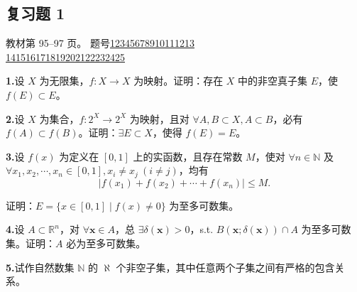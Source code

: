 \documentclass[11pt,a4paper]{article}
\begin{document}
\subsection*{复习题 1}
\noindent 教材第 95--97 页。
\noindent 题号\quad \hyperlink{review-q1}{1}\enspace \hyperlink{review-q2}{2}\enspace \hyperlink{review-q3}{3}\enspace \hyperlink{review-q4}{4}\enspace \hyperlink{review-q5}{5}\enspace \hyperlink{review-q6}{6}\enspace \hyperlink{review-q7}{7}\enspace \hyperlink{review-q8}{8}\enspace \hyperlink{review-q9}{9}\enspace \hyperlink{review-q10}{10}\enspace \hyperlink{review-q11}{11}\enspace \hyperlink{review-q12}{12}\enspace \hyperlink{review-q13}{13}\enspace \\\hspace*{3em} \hyperlink{review-q14}{14}\enspace \hyperlink{review-q15}{15}\enspace \hyperlink{review-q16}{16}\enspace \hyperlink{review-q17}{17}\enspace \hyperlink{review-q18}{18}\enspace \hyperlink{review-q19}{19}\enspace \hyperlink{review-q20}{20}\enspace \hyperlink{review-q21}{21}\enspace \hyperlink{review-q22}{22}\enspace \hyperlink{review-q23}{23}\enspace \hyperlink{review-q24}{24}\enspace \hyperlink{review-q25}{25}\enspace
\par{}\noindent\hypertarget{review-q1}{}\textbf{1.}\quad 设 $X$ 为无限集，$f:X\to X$ 为映射。证明：存在 $X$ 中的非空真子集 $E$，使 $f(E)\subset E$。
\par{}\noindent\hypertarget{review-q2}{}\textbf{2.}\quad 设 $X$ 为集合，$f:2^X\to 2^X$ 为映射，且对 $\forall A,B\subset X,A\subset B$，必有 $f(A)\subset f(B)$。证明：$\exists E\subset X$，使得 $f(E)=E$。
\par{}\noindent\hypertarget{review-q3}{}\textbf{3.}\quad 设 $f(x)$ 为定义在 $[0,1]$ 上的实函数，且存在常数 $M$，使对 $\forall n\in\mathbb N$ 及 $\forall x_1,x_2,\cdots,x_n\in[0,1],x_i\ne x_j\ (i\ne j)$，均有
\[|f(x_1)+f(x_2)+\cdots+f(x_n)|\leq M.\]
\par\noindent 证明：$E=\{x\in[0,1]\mid f(x)\ne0\}$ 为至多可数集。
\par{}\noindent\hypertarget{review-q4}{}\textbf{4.}\quad 设 $A\subset\mathbb R^n$，对 $\forall\boldsymbol{x}\in A$，总 $\exists\delta(\boldsymbol{x})>0$，s.t. $B(\boldsymbol{x};\delta(\boldsymbol{x}))\cap A$ 为至多可数集。证明：$A$ 必为至多可数集。
\par{}\noindent\hypertarget{review-q5}{}\textbf{5.}\quad 试作自然数集 $\mathbb N$ 的 $\aleph$ 个非空子集，其中任意两个子集之间有严格的包含关系。
\end{document}

